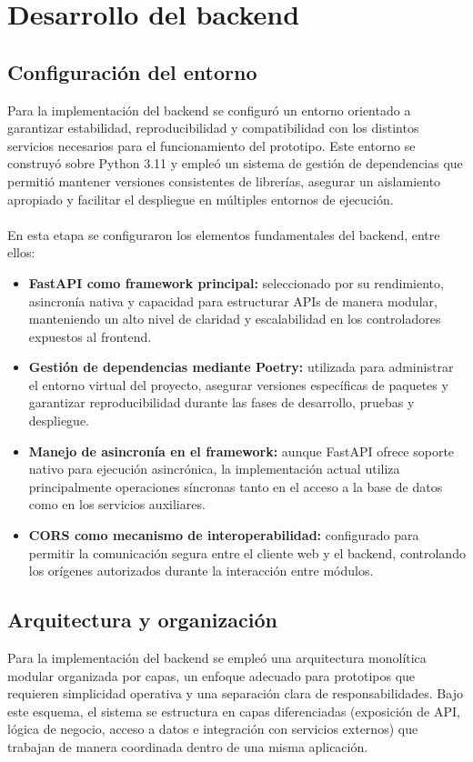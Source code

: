 \section{Desarrollo del backend}
\subsection{Configuración del entorno}

Para la implementación del backend se configuró un entorno orientado a garantizar estabilidad, reproducibilidad y compatibilidad con los distintos servicios necesarios para el funcionamiento del prototipo. Este entorno se construyó sobre Python 3.11 y empleó un sistema de gestión de dependencias que permitió mantener versiones consistentes de librerías, asegurar un aislamiento apropiado y facilitar el despliegue en múltiples entornos de ejecución.
\\
\\
En esta etapa se configuraron los elementos fundamentales del backend, entre ellos:

\begin{itemize}
    \item \textbf{FastAPI como framework principal:} seleccionado por su rendimiento, asincronía nativa y capacidad para estructurar APIs de manera modular, manteniendo un alto nivel de claridad y escalabilidad en los controladores expuestos al frontend.

    \item \textbf{Gestión de dependencias mediante Poetry:} utilizada para administrar el entorno virtual del proyecto, asegurar versiones específicas de paquetes y garantizar reproducibilidad durante las fases de desarrollo, pruebas y despliegue.

    \item \textbf{Manejo de asincronía en el framework:} aunque FastAPI ofrece soporte nativo para ejecución asincrónica, la implementación actual utiliza principalmente operaciones síncronas tanto en el acceso a la base de datos como en los servicios auxiliares.

    \item \textbf{CORS como mecanismo de interoperabilidad:} configurado para permitir la comunicación segura entre el cliente web y el backend, controlando los orígenes autorizados durante la interacción entre módulos.
\end{itemize}

\subsection{Arquitectura y organización}
 Para la implementación del backend se empleó una arquitectura monolítica modular organizada por capas, un enfoque adecuado para prototipos que requieren simplicidad operativa y una separación clara de responsabilidades. Bajo este esquema, el sistema se estructura en capas diferenciadas (exposición de API, lógica de negocio, acceso a datos e integración con servicios externos) que trabajan de manera coordinada dentro de una misma aplicación.

